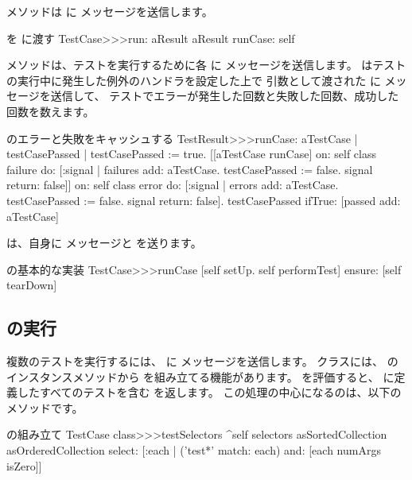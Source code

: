 \documentclass[a4paper,10pt,twoside]{book}
\begin{document}
 メソッドは  に  メッセージを送信します。

\begin{method}[testcaserun:]{ を  に渡す}
TestCase>>>run: aResult
	aResult runCase: self
\end{method}

 メソッドは、テストを実行するために各  に  メッセージを送信します。
 はテストの実行中に発生した例外のハンドラを設定した上で
引数として渡された  に  メッセージを送信して、
テストでエラーが発生した回数と失敗した回数、成功した回数を数えます。

\begin{method}[testresultruncase]{ のエラーと失敗をキャッシュする}
TestResult>>>runCase: aTestCase
	| testCasePassed |
	testCasePassed := true.
	[[aTestCase runCase] 
			on: self class failure
			do: 
				[:signal | 
				failures add: aTestCase.
				testCasePassed := false.
				signal return: false]]
					on: self class error
					do:
						[:signal |
						errors add: aTestCase.
						testCasePassed := false.
						signal return: false].
	testCasePassed ifTrue: [passed add: aTestCase]
\end{method}

 は、自身に  メッセージと  を送ります。

\begin{method}[testcaseruncase]{ の基本的な実装}
TestCase>>>runCase
	[self setUp.
	self performTest] ensure: [self tearDown]
\end{method}

\subsection{ の実行}

複数のテストを実行するには、  に  メッセージを送信します。
 クラスには、  のインスタンスメソッドから  を組み立てる機能があります。
 を評価すると、  に定義したすべてのテストを含む  を返します。
この処理の中心になるのは、以下のメソッドです。

\begin{method}[testcasetestselectors]{ の組み立て}
TestCase class>>>testSelectors 
	^self selectors asSortedCollection asOrderedCollection select: [:each | 
		('test*' match: each) and: [each numArgs isZero]]
\end{method}
\end{document}
